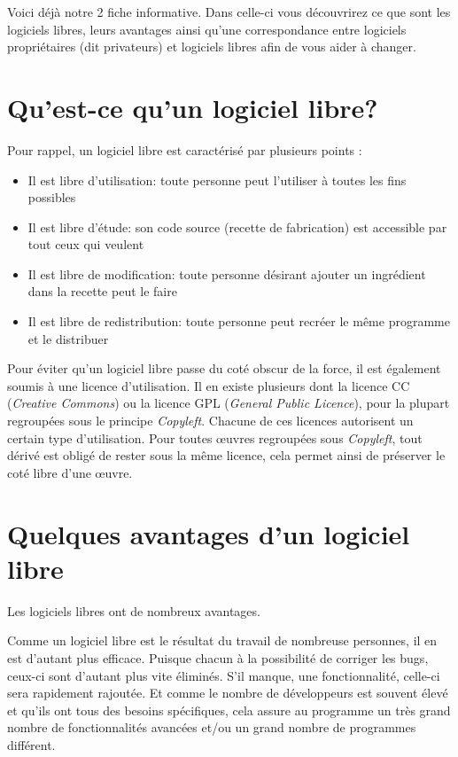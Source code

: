 




\vspace*{0.5cm}
Voici déjà notre 2 fiche informative. Dans celle-ci vous découvrirez ce que sont les logiciels libres, leurs avantages ainsi qu'une correspondance entre logiciels propriétaires (dit privateurs) et logiciels libres afin de vous aider à changer.

\section*{Qu'est-ce qu'un logiciel libre?}

Pour rappel, un logiciel libre est caractérisé par plusieurs points : 
\begin{itemize}
\item Il est libre d'utilisation: toute personne peut l'utiliser à toutes les fins possibles
\item Il est libre d'étude: son code source (recette de fabrication) est accessible par tout ceux qui veulent
\item Il est libre de modification: toute personne désirant ajouter un ingrédient dans la recette peut le faire
\item Il est libre de redistribution: toute personne peut recréer le même programme et le distribuer
\end{itemize}

Pour éviter qu'un logiciel libre passe du coté obscur de la force, il est également soumis à une licence d'utilisation. Il en existe plusieurs dont la licence CC (\textit{Creative Commons}) ou la licence GPL (\textit{General Public Licence}), pour la plupart regroupées sous le principe \textit{Copyleft}. Chacune de ces licences autorisent un certain type d'utilisation. Pour toutes œuvres regroupées sous \textit{Copyleft}, tout dérivé est obligé de rester sous la même licence, cela permet ainsi de préserver le coté libre d'une œuvre.

\section*{Quelques avantages d'un logiciel libre}

Les logiciels libres ont de nombreux avantages.

Comme un logiciel libre est le résultat du travail de nombreuse personnes, il en est d'autant plus efficace. Puisque chacun à la possibilité de corriger les bugs, ceux-ci sont d'autant plus vite éliminés. S'il manque, une fonctionnalité, celle-ci sera rapidement rajoutée. Et comme le nombre de développeurs est souvent élevé et qu'ils ont tous des besoins spécifiques, cela assure au programme un très grand nombre de fonctionnalités avancées et/ou un grand nombre de programmes différent.

